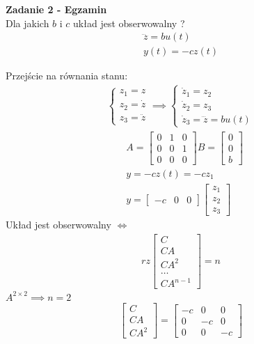 \documentclass[a4paper,11pt]{article}
\begin{document}
\newpage
\begin{framed}
\textbf{Zadanie 2 - Egzamin } \\ 
Dla jakich \( b\) i \(c\) układ jest obserwowalny ?
\begin{align*}
\dddot{z}=bu(t) \\
y(t)=-cz(t)
\end{align*}
\end{framed}
Przejście na równania stanu:
\begin{align*}
\begin{cases}
z_{1}=z \\
z_{2}=\dot{z} \\
z_{3}=\ddot{z}
\end{cases}
\implies
\begin{cases}
\dot{z}_{1}=z_{2} \\
\dot{z}_{2}=z_{3} \\
\dot{z}_{3}=\dddot{z}=bu(t)
\end{cases}
\end{align*}
\begin{align*}
&A =
\begin{bmatrix}
0 & 1 & 0 \\
0 & 0 & 1 \\
0 & 0 & 0 
\end{bmatrix}
B = 
\begin{bmatrix}
0 \\
0 \\
b
\end{bmatrix} \\
&y=-cz(t) = -cz_{1}\\
&y = 
\begin{bmatrix}
-c & 0 & 0
\end{bmatrix}
\begin{bmatrix}
z_{1} \\
z_{2} \\
z_{3}
\end{bmatrix}
\end{align*}
Układ jest obserwowalny \( \Longleftrightarrow \) 
\begin{align*}
rz \begin{bmatrix}
C \\
CA \\
CA^{2} \\
\dots \\
CA^{n-1}
\end{bmatrix}
= n
\end{align*}
\(A^{2\times 2} \implies n = 2\)
\begin{align*}
\begin{bmatrix}
C \\
CA \\
CA^{2} 
\end{bmatrix}
=
\begin{bmatrix}
-c & 0 & 0 \\
0 & -c & 0 \\
0 & 0 & -c
\end{bmatrix}
\end{align*}
\end{document}
